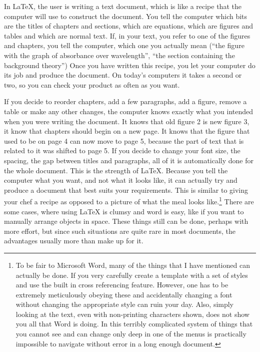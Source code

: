 \documentclass[11pt]{article}
\begin{document}
\pagebreak

In LaTeX, the user is writing a text document, which is like a recipe that the computer will use to construct the document. You tell the computer which bits are the titles of chapters and sections, which are equations, which are figures and tables and which are normal text. If, in your text, you refer to one of the figures and chapters, you tell the computer, which one you actually mean (``the figure with the graph of absorbance over wavelength'', ``the section containing the background theory'') Once you have written this recipe, you let your computer do its job and produce the document. On today's computers it takes a second or two, so you can check your product as often as you want.

If you decide to reorder chapters, add a few paragraphs, add a figure, remove a table or make any other changes, the computer knows exactly what you intended when you were writing the document. It knows that old figure 2 is new figure 3, it know that chapters should begin on a new page. It knows that the figure that used to be on page 4 can now move to page 5, because the part of text that is related to it was shifted to page 5. If you decide to change your font size, the spacing, the gap between titles and paragraphs, all of it is automatically done for the whole document. This is the strength of LaTeX. Because you tell the computer what you want, and not what it looks like, it can actually try and produce a document that best suits your requirements. This is similar to giving your chef a recipe as opposed to a picture of what the meal looks like.\footnote{To be fair to Microsoft Word, many of the things that I have mentioned can actually be done. If you very carefully create a template with a set of styles and use the built in cross referencing feature. However, one has to be extremely meticulously obeying these and accidentally changing a font without changing the appropriate style can ruin your day. Also, simply looking at the text, even with non-printing characters shown, does not show you all that Word is doing. In this terribly complicated system of things that you cannot see and can change only deep in one of the menus is practically impossible to navigate without error in a long enough document.} There are some cases, where using LaTeX is clumsy and word is easy, like if you want to manually arrange objects in space. These things still can be done, perhaps with more effort, but since such situations are quite rare in most documents, the advantages usually more than make up for it.
\pagebreak
\end{document}
